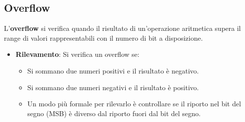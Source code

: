 \subsection{Overflow}
L'\textbf{overflow} si verifica quando il risultato di un'operazione aritmetica supera il range di valori rappresentabili con il numero di bit a disposizione.
\begin{itemize}
    \item \textbf{Rilevamento}: Si verifica un overflow se:
    \begin{itemize}
        \item Si sommano due numeri positivi e il risultato è negativo.
        \item Si sommano due numeri negativi e il risultato è positivo.
        \item Un modo più formale per rilevarlo è controllare se il riporto nel bit del segno (MSB) è diverso dal riporto fuori dal bit del segno.
    \end{itemize}
\end{itemize}